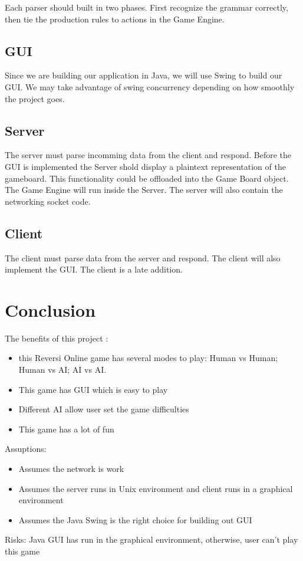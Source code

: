 \documentclass{article}
\begin{document}
Each parser should built in two phases. First recognize the grammar correctly, then 
tie the production rules to actions in the Game Engine.


\subsection{GUI}
Since we are building our application in Java, we will use Swing to build 
our GUI. We may take advantage of swing concurrency depending on how 
smoothly the project goes. 

\subsection{Server}
The server must parse incomming data from the client and respond.
Before the GUI is implemented the Server shold display a plaintext representation 
of the gameboard. This functionality could be offloaded into the Game Board object.
The Game Engine will run inside the Server. The server will also contain the networking
socket code.

\subsection{Client}
The client must parse data from the server and respond. The client will also
implement the GUI. The client is a late addition.  

\section{Conclusion} %
The benefits of this project : 
\begin{itemize}
\item this Reversi Online game has several modes to play: Human vs Human; Human vs AI; AI vs AI. 
\item This game has GUI which is easy to play
\item Different AI allow user set the game difficulties
\item This game has a lot of fun
\end{itemize}
Assuptions:
\begin{itemize}
\item Assumes the network is work 
\item Assumes the server runs in Unix environment and client runs in a graphical environment
\item Assumes the Java Swing is the right choice for building out GUI
\end{itemize}
Risks: Java GUI has run in the  graphical environment, otherwise, user can’t play this game
\end{document}
